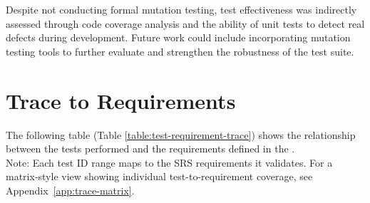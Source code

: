 \documentclass[12pt, titlepage]{article}
\begin{document}
Despite not conducting formal mutation testing, test effectiveness
was indirectly assessed through code coverage analysis and the
ability of unit tests to detect real defects during development.
Future work could include incorporating
mutation testing tools to further evaluate and strengthen the
robustness of the test suite.

\section{Trace to Requirements}
The following table (Table \ref{table:test-requirement-trace}) shows
the relationship between the tests performed and
the requirements deﬁned in the \citet{SRS}.\\
\noindent Note: Each test ID range maps to the SRS requirements it validates. For a matrix-style view showing individual test-to-requirement coverage, see Appendix~\ref{app:trace-matrix}.
\end{document}
